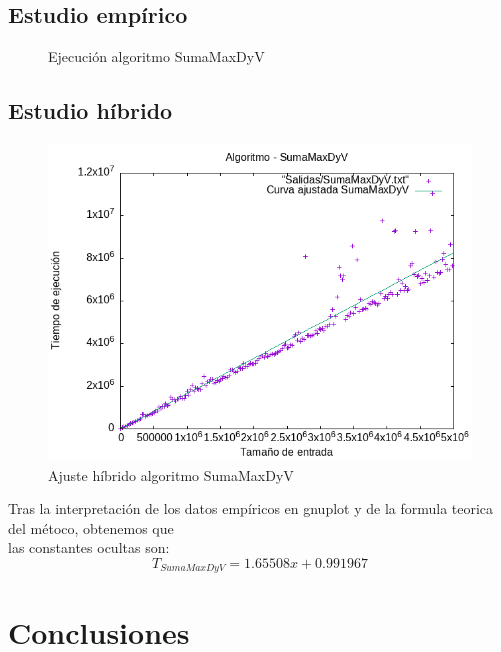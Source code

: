 \documentclass[11pt,openany]{book}
\begin{document}
\section*{Estudio empírico}
\begin{center}
      \begin{figure}[h]
                \centering
                \caption{Ejecución algoritmo SumaMaxDyV}
                \label{fig:SumaMaxDyV}
      \end{figure}
\end{center}
\newpage
\section*{Estudio híbrido}
\begin{center}
      \begin{figure}[h]
              \centering
              \includegraphics[width=0.8\linewidth]{../Codigos/AjusteHibrido/SumaMaxDyV_hib.png}
              \caption{Ajuste híbrido algoritmo SumaMaxDyV}
              \label{fig:sumaMax}
      \end{figure}
\end{center}
  Tras la interpretación de los datos empíricos en gnuplot y de la formula teorica del métoco, obtenemos que \\
  las constantes ocultas son:
  \begin{equation*}
      T_{SumaMaxDyV}=1.65508x + 0.991967
  \end{equation*}
  


\chapter{Conclusiones}
\end{document}
